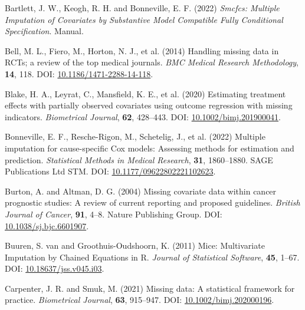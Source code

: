 \documentclass[
  letterpaper,
  DIV=11,
  numbers=noendperiod]{scrreprt}
\newlength{\cslhangindent}
\newlength{\cslentryspacingunit} %
\newenvironment{CSLReferences}[2] %
 {%
  \setlength{\parindent}{0pt}
  \ifodd #1
  \let\oldpar\par
  \def\par{\hangindent=\cslhangindent\oldpar}
  \fi
  \setlength{\parskip}{#2\cslentryspacingunit}
 }%
 {}
\begin{document}
\begin{CSLReferences}{1}{0}
\leavevmode{}%
Bartlett, J. W., Keogh, R. H. and Bonneville, E. F. (2022) \emph{Smcfcs:
{Multiple} Imputation of Covariates by Substantive Model Compatible
Fully Conditional Specification}. Manual.

\leavevmode{}%
Bell, M. L., Fiero, M., Horton, N. J., et al. (2014) Handling missing
data in {RCTs}; a review of the top medical journals. \emph{BMC Medical
Research Methodology}, \textbf{14}, 118. DOI:
\href{https://doi.org/10.1186/1471-2288-14-118}{10.1186/1471-2288-14-118}.

\leavevmode{}%
Blake, H. A., Leyrat, C., Mansfield, K. E., et al. (2020) Estimating
treatment effects with partially observed covariates using outcome
regression with missing indicators. \emph{Biometrical Journal},
\textbf{62}, 428--443. DOI:
\href{https://doi.org/10.1002/bimj.201900041}{10.1002/bimj.201900041}.

\leavevmode{}%
Bonneville, E. F., Resche-Rigon, M., Schetelig, J., et al. (2022)
Multiple imputation for cause-specific {Cox} models: {Assessing} methods
for estimation and prediction. \emph{Statistical Methods in Medical
Research}, \textbf{31}, 1860--1880. SAGE Publications Ltd STM. DOI:
\href{https://doi.org/10.1177/09622802221102623}{10.1177/09622802221102623}.

\leavevmode{}%
Burton, A. and Altman, D. G. (2004) Missing covariate data within cancer
prognostic studies: A review of current reporting and proposed
guidelines. \emph{British Journal of Cancer}, \textbf{91}, 4--8. Nature
Publishing Group. DOI:
\href{https://doi.org/10.1038/sj.bjc.6601907}{10.1038/sj.bjc.6601907}.

\leavevmode{}%
Buuren, S. van and Groothuis-Oudshoorn, K. (2011) Mice: {Multivariate
Imputation} by {Chained Equations} in {R}. \emph{Journal of Statistical
Software}, \textbf{45}, 1--67. DOI:
\href{https://doi.org/10.18637/jss.v045.i03}{10.18637/jss.v045.i03}.

\leavevmode{}%
Carpenter, J. R. and Smuk, M. (2021) Missing data: {A} statistical
framework for practice. \emph{Biometrical Journal}, \textbf{63},
915--947. DOI:
\href{https://doi.org/10.1002/bimj.202000196}{10.1002/bimj.202000196}.


\end{CSLReferences}
\end{document}
